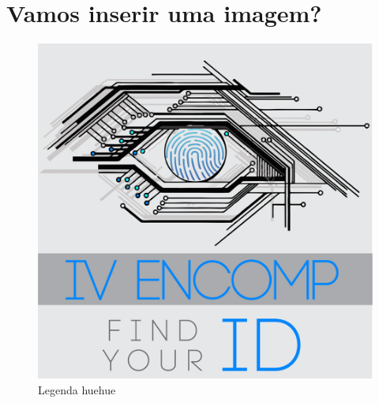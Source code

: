 \documentclass[10pt,a4paper,twocolumn]{book}
\begin{document}
	\section*{Vamos inserir uma imagem?}
	
		\begin{figure}[h]
			\caption{Legenda huehue}
			\includegraphics[scale=0.2]{figuras/encomp-logo.png}
		\end{figure}
	
\end{document}
